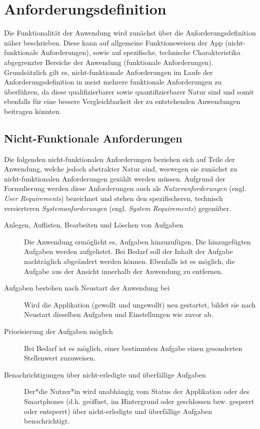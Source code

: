 \section{Anforderungsdefinition}
Die Funktionalität der Anwendung wird zunächst über die Anforderungsdefinition näher beschrieben. Diese kann auf allgemeine Funktionsweisen der App (nicht-funktionale Anforderungen), sowie auf spezifische, technische Charakteristika abgegrenzter Bereiche der Anwendung (funktionale Anforderungen). Grundsätzlich gilt es, nicht-funktionale Anforderungen im Laufe der Anforderungsdefinition in meist mehrere funktionale Anforderungen zu überführen, da diese qualifizierbarer sowie quantifizierbarer Natur sind und somit ebenfalls für eine bessere Vergleichbarkeit der zu entstehenden Anwendungen beitragen könnten.

\subsection{Nicht-Funktionale Anforderungen}
Die folgenden nicht-funktionalen Anforderungen beziehen sich auf Teile der Anwendung, welche jedoch abstrakter Natur sind, weswegen sie zunächst zu nicht-funktionalen Anforderungen gezählt werden müssen. Aufgrund der Formulierung werden diese Anforderungen auch als \textit{Nutzeranforderungen} (engl. \textit{User Requirements}) bezeichnet und stehen den spezifischeren, technisch versierteren \textit{Systemanforderungen} (engl. \textit{System Requirements}) gegenüber.
\begin{description}
    \item[Anlegen, Auflisten, Bearbeiten und Löschen von Aufgaben] Die Anwendung ermöglicht es, Aufgaben hinzuzufügen. Die hinzugefügten Aufgaben werden aufgelistet. Bei Bedarf soll der Inhalt der Aufgabe nachträglich abgeändert werden können. Ebenfalls ist es möglich, die Aufgabe aus der Ansicht innerhalb der Anwendung zu entfernen.
    \item[Aufgaben bestehen nach Neustart der Anwendung bei] Wird die Applikation (gewollt und ungewollt) neu gestartet, bildet sie nach Neustart dieselben Aufgaben und Einstellungen wie zuvor ab.
    \item[Priorisierung der Aufgaben möglich] Bei Bedarf ist es möglich, einer bestimmten Aufgabe einen gesonderten Stellenwert zuzuweisen.
    \item[Benachrichtigungen über nicht-erledigte und überfällige Aufgaben] Der*die Nutzer*in wird unabhängig vom Status der Applikation oder des Smartphones (d.h. geöffnet, im Hintergrund oder geschlossen bzw. gesperrt oder entsperrt) über nicht-erledigte und überfällige Aufgaben benachrichtigt.
\end{description}
